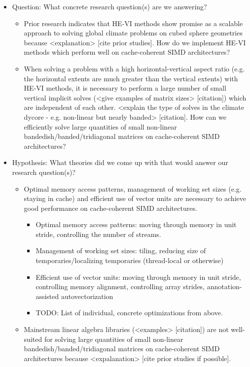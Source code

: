 \documentclass[conference]{IEEEtran}
\begin{document}
\begin{itemize}
\item Question: What concrete research question(s) are we answering?
\begin{itemize}
\item Prior research indicates that HE-VI methods show promise as a
scalable approach to solving global climate problems on cubed sphere
geometries because <explanation> [cite prior studies]. How do we
implement HE-VI methods which perform well on cache-coherent SIMD
architectures?
\item When solving a problem with a high horizontal-vertical aspect ratio
(e.g. the horizontal extents are much greater than the vertical
extents) with HE-VI methods, it is necessary to perform a large number
of small vertical implicit solves (<give examples of matrix sizes>
[citation]) which are independent of each other. <explain the type of
solves in the climate dycore - e.g. non-linear but nearly banded>
[citation]. How can we efficiently solve large quantities of small
non-linear bandedish/banded/tridiagonal matrices on cache-coherent
SIMD architectures?
\end{itemize}
\item Hypothesis: What theories did we come up with that would answer our
research question(s)?
\begin{itemize}
\item Optimal memory access patterns, management of working set sizes
(e.g. staying in cache) and efficient use of vector units are
necessary to achieve good performance on cache-coherent SIMD
architectures.
\begin{itemize}
\item Optimal memory access patterns: moving through memory in unit
stride, controlling the number of streams.
\item Management of working set sizes: tiling, reducing size of
temporaries/localizing temporaries (thread-local or otherwise)
\item Efficient use of vector units: moving through memory in unit
stride, controlling memory alignment, controlling array strides,
annotation-assisted autovectorization
\item TODO: List of individual, concrete optimizations from above.
\end{itemize}
\item Mainstream linear algebra libraries (<examples> [citation]) are not
well-suited for solving large quantities of small non-linear
bandedish/banded/tridiagonal matrices on cache-coherent SIMD
architectures because <expalanation> [cite prior studies if possible].
\end{itemize}



\end{itemize}
\end{document}
